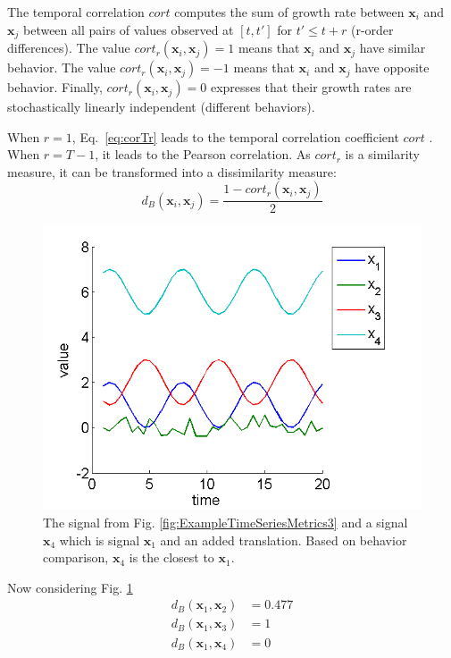 The temporal correlation $cort$ computes the sum of growth rate between $\textbf{x}_i$ and $\textbf{x}_j$ between all pairs of values observed at $[t ,t']$ for $t' \leq t+r$ (r-order differences). The value $cort_r(\textbf{x}_i,\textbf{x}_j) = 1$ means that $\textbf{x}_i$ and $\textbf{x}_j$  have similar behavior. The value $cort_r(\textbf{x}_i,\textbf{x}_j) = -1$ means that $\textbf{x}_i$ and $\textbf{x}_j$ have opposite behavior. Finally, $cort_r(\textbf{x}_i,\textbf{x}_j) = 0$ expresses that their growth rates are stochastically linearly independent (different behaviors). 

When $r=1$, Eq.~\eqref{eq:corTr} leads to the temporal correlation coefficient $cort$ \cite{AhlameDouzal-Chouakria2011}. When $r=T-1$, it leads to the Pearson correlation. As $cort_r$ is a similarity measure, it can be transformed into a dissimilarity measure:
\begin{equation}
	d_B(\textbf{x}_i,\textbf{x}_j) = \frac{1 - cort_r(\textbf{x}_i,\textbf{x}_j)}{2}
	\label{eq:B}
\end{equation}

\begin{figure}[h!]
	\centering
	\includegraphics[width=0.7\linewidth]{images/ExampleTimeSeriesMetrics4}
	\caption{The signal from Fig. \ref{fig:ExampleTimeSeriesMetrics3} and a signal $\textbf{x}_4$ which is signal $\textbf{x}_1$ and an added translation. Based on behavior comparison, $\textbf{x}_4$ is the closest to $\textbf{x}_1$.}
	\label{fig:ExampleTimeSeriesMetrics4}
\end{figure}

Now considering Fig. \ref{fig:ExampleTimeSeriesMetrics4}
\begin{align*}
d_B(\textbf{x}_1,\textbf{x}_2) &= 0.477 \\  
d_B(\textbf{x}_1,\textbf{x}_3) &= 1 \\  
d_B(\textbf{x}_1,\textbf{x}_4) &= 0 \\ 
\label{key}
\end{align*}  

